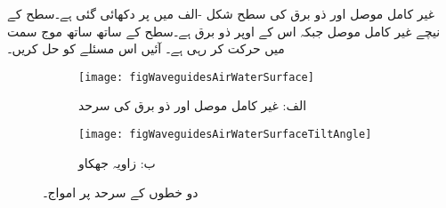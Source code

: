غیر کامل موصل اور ذو برق کی سطح شکل -الف میں   پر دکھائی گئی ہے۔سطح کے نیچے   غیر کامل موصل جبکہ اس کے اوپر  ذو برق ہے۔سطح کے ساتھ ساتھ  موج   سمت میں حرکت کر رہی ہے۔ آئیں اس مسئلے کو حل کریں۔

\begin{figure}
\centering
\begin{subfigure}{0.4\textwidth}
\centering
\texttt{[image: figWaveguidesAirWaterSurface]}
\caption*{الف: غیر کامل موصل اور ذو برق کی سرحد}
\end{subfigure}%
%
\begin{subfigure}{0.4\textwidth}
\centering
\texttt{[image: figWaveguidesAirWaterSurfaceTiltAngle]}
\caption*{ب: زاویہ جھکاو}
\end{subfigure}
\caption{دو خطوں کے سرحد پر امواج۔}
\label{شکل_مویج_ہوا_غیر_کامل_ذو_برق_سرحد}
\end{figure}

